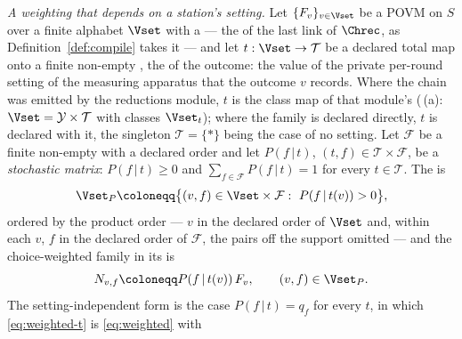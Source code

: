 \begin{definition}
\emph{A weighting that depends on a station's setting.} Let
$\{F_v\}_{v\in\Vset}$ be a POVM on $S$ over a finite alphabet $\Vset$ with a
 --- the  of the last link of $\Chrec$, as
Definition~\ref{def:compile} takes it --- and let
$t:\Vset\to\mathcal{T}$ be a declared total map onto a finite non-empty
,
the
of the outcome: the value of the private per-round setting of the measuring
apparatus that the outcome $v$ records. Where the chain was emitted by the reductions module, $t$ is the
class map of that module's 
(\,(a): $\Vset=\mathcal{Y}\times\mathcal{T}$
with classes $\Vset_t$); where the family is declared directly, $t$ is
declared with it, the singleton $\mathcal{T}=\{\ast\}$ being the case of no
setting. Let $\mathcal{F}$ be a finite non-empty
with a declared order and let $P(f\,|\,t)$,
$(t,f)\in\mathcal{T}\times\mathcal{F}$, be a \emph{stochastic matrix}:
$P(f\,|\,t)\ge0$ and $\sum_{f\in\mathcal{F}}P(f\,|\,t)=1$ for every
$t\in\mathcal{T}$. The
is
\begin{equation}\label{eq:support}
  \Vset_P\coloneqq\big\{(v,f)\in\Vset\times\mathcal{F}:\ P(f\,|\,t(v))>0\big\},
\end{equation}
ordered by the product order --- $v$ in the declared order of $\Vset$ and,
within each $v$, $f$ in the declared order of $\mathcal{F}$, the pairs off
the support omitted --- and the choice-weighted family in its
is
\begin{equation}\label{eq:weighted-t}
  N_{v,f}\coloneqq P(f\,|\,t(v))\,F_v,\qquad (v,f)\in\Vset_P .
\end{equation}
The setting-independent form is the case $P(f\,|\,t)=q_f$ for every $t$, in
which \eqref{eq:weighted-t} is \eqref{eq:weighted} with

\end{definition}
